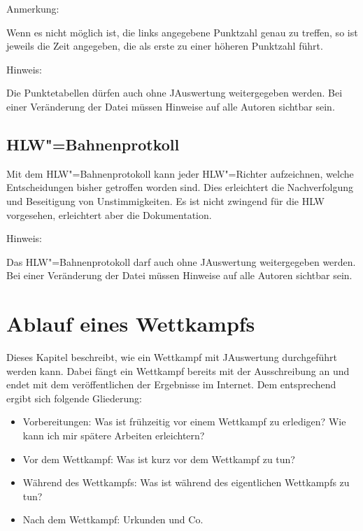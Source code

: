 \documentclass[11pt,a4paper,twoside,ngerman]{article}
\begin{document}
\begin{bfseries}Anmerkung:\end{bfseries} Wenn es nicht möglich ist, die links angegebene Punktzahl genau zu treffen, so ist jeweils die Zeit angegeben, die als erste zu einer höheren Punktzahl führt.

\begin{bfseries}Hinweis:\end{bfseries} Die Punktetabellen dürfen auch ohne JAuswertung weitergegeben werden. Bei einer Veränderung der Datei müssen Hinweise auf alle Autoren sichtbar sein.


\newpage

\subsection{HLW"=Bahnenprotkoll}
\label{lbl:bahnenprotokoll::begin}
Mit dem HLW"=Bahnenprotokoll kann jeder HLW"=Richter aufzeichnen, welche Entscheidungen bisher getroffen worden sind. Dies erleichtert die Nachverfolgung und Beseitigung von Unstimmigkeiten. Es ist nicht zwingend für die HLW vorgesehen, erleichtert aber die Dokumentation.

\begin{bfseries}Hinweis:\end{bfseries} Das HLW"=Bahnenprotokoll darf auch ohne JAuswertung weitergegeben werden. Bei einer Veränderung der Datei müssen Hinweise auf alle Autoren sichtbar sein.


\newpage

\section{Ablauf eines Wettkampfs}
\label{lbl:ablauf::begin}
Dieses Kapitel beschreibt, wie ein Wettkampf mit JAuswertung durchgeführt werden kann. Dabei fängt ein Wettkampf bereits mit der Ausschreibung an und endet mit dem veröffentlichen der Ergebnisse im Internet. Dem entsprechend ergibt sich folgende Gliederung:


\begin{itemize}

\item Vorbereitungen: Was ist frühzeitig vor einem Wettkampf zu erledigen? Wie kann ich mir spätere Arbeiten erleichtern?


\item Vor dem Wettkampf: Was ist kurz vor dem Wettkampf zu tun?


\item Während des Wettkampfs: Was ist während des eigentlichen Wettkampfs zu tun?


\item Nach dem Wettkampf: Urkunden und Co.


\end{itemize}
\end{document}
